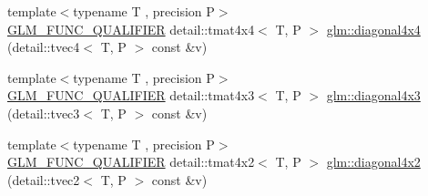 \begin{DoxyCompactItemize}
\item 
{\footnotesize template$<$typename T , precision P$>$ }\\\hyperlink{setup_8hpp_a33fdea6f91c5f834105f7415e2a64407}{G\+L\+M\+\_\+\+F\+U\+N\+C\+\_\+\+Q\+U\+A\+L\+I\+F\+I\+ER} detail\+::tmat4x4$<$ T, P $>$ \hyperlink{group__gtx__matrix__operation_ga0c286e9aa92074f12663617cfedfa72c}{glm\+::diagonal4x4} (detail\+::tvec4$<$ T, P $>$ const \&v)
\item 
{\footnotesize template$<$typename T , precision P$>$ }\\\hyperlink{setup_8hpp_a33fdea6f91c5f834105f7415e2a64407}{G\+L\+M\+\_\+\+F\+U\+N\+C\+\_\+\+Q\+U\+A\+L\+I\+F\+I\+ER} detail\+::tmat4x3$<$ T, P $>$ \hyperlink{group__gtx__matrix__operation_gaff804ead2f02ac48c8daf0d44a81d224}{glm\+::diagonal4x3} (detail\+::tvec3$<$ T, P $>$ const \&v)
\item 
{\footnotesize template$<$typename T , precision P$>$ }\\\hyperlink{setup_8hpp_a33fdea6f91c5f834105f7415e2a64407}{G\+L\+M\+\_\+\+F\+U\+N\+C\+\_\+\+Q\+U\+A\+L\+I\+F\+I\+ER} detail\+::tmat4x2$<$ T, P $>$ \hyperlink{group__gtx__matrix__operation_ga1ec0fc953d871fc9894bcfcc81dbaf68}{glm\+::diagonal4x2} (detail\+::tvec2$<$ T, P $>$ const \&v)
\end{DoxyCompactItemize}
